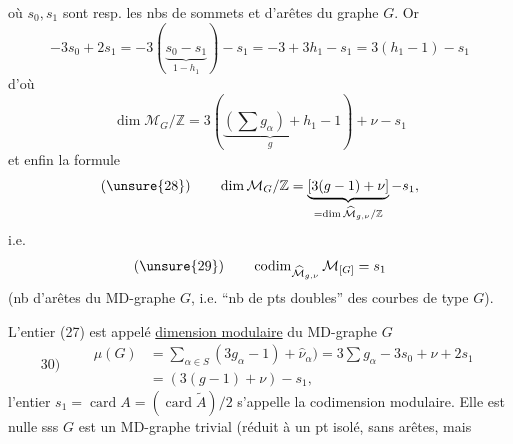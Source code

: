 où $s_0,s_1$ sont resp. les nbs de sommets et d'arêtes du graphe $G$. Or
\[
-3s_0+2s_1=-3(\underbrace{s_0-s_1}_{1-h_1})-s_1=-3+3h_1-s_1=3(h_1-1)-s_1
\]
d'où
\[
\dim\mathcal M_G/\mathbb Z=3(\underbrace{(\sum g_\alpha)+h_1}_{g}-1)+\nu-s_1
\]
et enfin la formule
\[
(\unsure{28})\qquad\dim\mathcal M_G/\mathbb Z=\underbrace{[3(g-1)+\nu]}_{=\dim\widehat{\mathcal M}_{g,\nu}/\mathbb Z}-s_1,
\]
i.e.
\[
(\unsure{29})\qquad\operatorname{codim}_{\widehat{\mathcal M}_{g,\nu}}\mathcal M_{[G]}=s_1
\]
(nb d'arêtes du MD-graphe $G$, i.e. ``nb de pts doubles'' des courbes  de type $G$).

L'entier (27) est appelé \uline{dimension modulaire} du MD-graphe $G$
\[
30)\qquad\begin{aligned}
\mu(G)&=\sum_{\alpha\in S}(3g_\alpha-1)+\widehat\nu_\alpha)=3\sum g_\alpha-3s_0+\nu+2s_1\\
&=(3(g-1)+\nu)-s_1,
\end{aligned}
\]
l'entier $s_1=\operatorname{card}A=(\operatorname{card}\widetilde A)/2$ s'appelle la codimension modulaire. Elle est nulle sss $G$ est un MD-graphe trivial (réduit à un pt isolé, sans arêtes, mais
